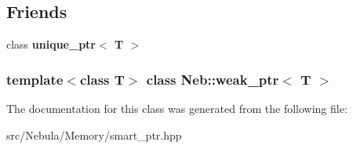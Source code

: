 \subsection*{\-Friends}
\begin{DoxyCompactItemize}
\item 
\hypertarget{classNeb_1_1weak__ptr_af421c41ed797729bb606ba7df50551aa}{class {\bfseries unique\-\_\-ptr$<$ T $>$}}\label{classNeb_1_1weak__ptr_af421c41ed797729bb606ba7df50551aa}

\end{DoxyCompactItemize}
\subsubsection*{template$<$class \-T$>$ class Neb\-::weak\-\_\-ptr$<$ T $>$}



\-The documentation for this class was generated from the following file\-:\begin{DoxyCompactItemize}
\item 
src/\-Nebula/\-Memory/smart\-\_\-ptr.\-hpp\end{DoxyCompactItemize}
